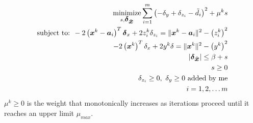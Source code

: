 \begin{eqnarray} \label{eq:6.7}
\Min_{s, \Bdelta_{\tilde{\Bx}}} \sum^m_{i=1}\left( -\delta_y + \delta_{z_i} -\tilde{d_i}\right)^2 + \mu^k s \\
\nonumber
\mbox{subject to: }  - 2\left( \Bx^k  - \Ba_i \right)^T\Bdelta_x + 2z_i^k\delta_{z_i}  = \|\Bx^k  - \Ba_i\|^2 - \left(z_i^k\right)^2 \\
\nonumber
-2\left(\Bx^k\right)^T\delta_x + 2y^k\delta = \|\Bx^k\|^2 - \left(y^k\right)^2 \\
\nonumber
|\Bdelta_{\tilde{\Bx}}|  \leq \beta + s\\
\nonumber
s \geq 0 \\ 
\nonumber
\delta_{z_i} \geq 0, \ 
\delta_y \geq 0 \mbox{  added by me}
\\ \nonumber  i = 1, 2, \ldots m
\end{eqnarray}
$\mu^k \geq 0$ is the weight that monotonically increases as iterations proceed until it reaches an upper limit $\mu_{max}$. 